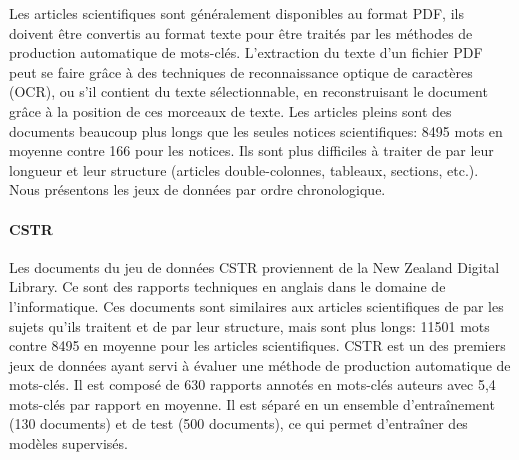 Les articles scientifiques sont généralement disponibles au format PDF, ils doivent être convertis au format texte pour être traités par les méthodes de production automatique de mots-clés.
L'extraction du texte d'un fichier PDF peut se faire grâce à des techniques de reconnaissance optique de caractères (OCR), ou s'il contient du texte sélectionnable, en reconstruisant le document grâce à la position de ces morceaux de texte.
Les articles pleins sont des documents beaucoup plus longs que les seules notices scientifiques: \num{8 495} mots en moyenne contre 166 pour les notices. Ils sont plus difficiles à traiter de par leur longueur et leur structure (articles double-colonnes, tableaux, sections, etc.).
Nous présentons les jeux de données par ordre chronologique.



\paragraph{CSTR~\cite{witten_kea:_1999}}
Les documents du jeu de données CSTR proviennent de la New Zealand Digital Library. Ce sont des rapports techniques en anglais dans le domaine de l'informatique. Ces documents sont similaires aux articles scientifiques de par les sujets qu'ils traitent et de par leur structure, mais sont plus longs: \num{11 501} mots contre \num{8 495} en moyenne pour les articles scientifiques.
CSTR est un des premiers jeux de données ayant servi à évaluer une méthode de production automatique de mots-clés.
Il est composé de 630 rapports annotés en mots-clés auteurs avec 5,4 mots-clés par rapport en moyenne.
Il est séparé en un ensemble d'entraînement (130 documents) et de test (500 documents), ce qui permet d'entraîner des modèles supervisés.



